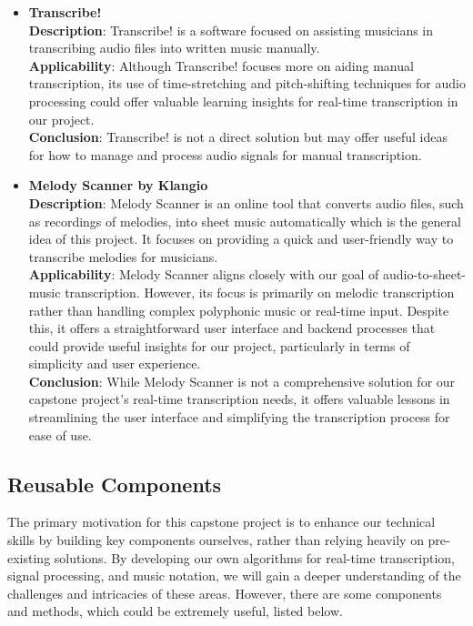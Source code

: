 \documentclass[12pt]{article}
\begin{document}
\begin{itemize}
    \item \textbf{Transcribe!}\cite{Transcribe!}\\
    \textbf{Description}: Transcribe! is a software focused on assisting musicians in transcribing audio files into written music manually.\\
    \textbf{Applicability}: Although Transcribe! focuses more on aiding manual transcription, its use of time-stretching and pitch-shifting techniques for audio processing could offer valuable learning insights for real-time transcription in our project.\\
    \textbf{Conclusion}: Transcribe! is not a direct solution but may offer useful ideas for how to manage and process audio signals for manual transcription.
    
    \item \textbf{Melody Scanner by Klangio}\cite{Melody-Scanner}\\
    \textbf{Description}: Melody Scanner is an online tool that converts audio files, such as recordings of melodies, into sheet music automatically which is the general idea of this project. It focuses on providing a quick and user-friendly way to transcribe melodies for musicians.\\
    \textbf{Applicability}: Melody Scanner aligns closely with our goal of audio-to-sheet-music transcription. However, its focus is primarily on melodic transcription rather than handling complex polyphonic music or real-time input. Despite this, it offers a straightforward user interface and backend processes that could provide useful insights for our project, particularly in terms of simplicity and user experience.\\
    \textbf{Conclusion}: While Melody Scanner is not a comprehensive solution for our capstone project’s real-time transcription needs, it offers valuable lessons in streamlining the user interface and simplifying the transcription process for ease of use.
\end{itemize}

\subsection{Reusable Components}
The primary motivation for this capstone project is to enhance our technical skills by building key components ourselves, rather than relying heavily on pre-existing solutions. By developing our own algorithms for real-time transcription, signal processing, and music notation, we will gain a deeper understanding of the challenges and intricacies of these areas. However, there are some components and methods, which could be extremely useful, listed below.
\end{document}
